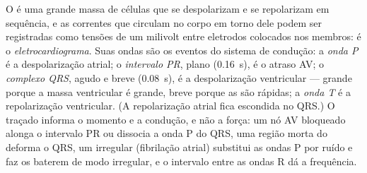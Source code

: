 \begin{proposition}[O eletrocardiograma]\label{prop:b2:heart:ecg}
O  é uma grande massa de células que se despolarizam e se
repolarizam em sequência, e as correntes que circulam no corpo em torno
dele podem ser registradas como tensões de um milivolt entre eletrodos
colocados nos membros: é o \emph{eletrocardiograma}. Suas ondas são os
eventos do sistema de condução: a \emph{onda P} é a despolarização
atrial; o \emph{intervalo PR}, plano (\qty{0.16}{s}), é o atraso AV; o
\emph{complexo QRS}, agudo e breve (\qty{0.08}{s}), é a despolarização
ventricular --- grande porque a massa ventricular é grande, breve porque
as  são rápidas; a \emph{onda T} é a repolarização
ventricular. (A repolarização atrial fica escondida no QRS.) O traçado
informa o momento e a condução, e não a força: um nó AV bloqueado
alonga o intervalo PR ou dissocia a onda P do QRS, uma região morta do
 deforma o QRS, um  irregular (fibrilação atrial)
substitui as ondas P por ruído e faz os  baterem de modo
irregular, e o intervalo entre as ondas R dá a frequência.
\end{proposition}

